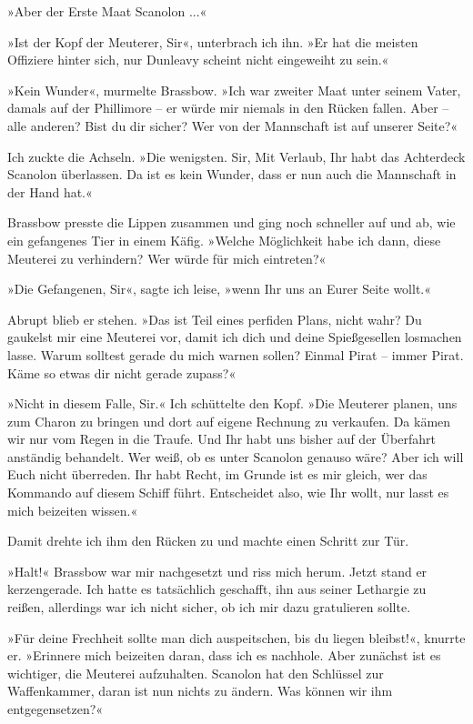 »Aber der Erste Maat Scanolon ...«

»Ist der Kopf der Meuterer, Sir«, unterbrach ich ihn. »Er hat die
meisten Offiziere hinter sich, nur Dunleavy scheint nicht
eingeweiht zu sein.«

»Kein Wunder«, murmelte Brassbow. »Ich war zweiter Maat unter
seinem Vater, damals auf der Phillimore – er würde mir niemals in
den Rücken fallen. Aber – alle anderen? Bist du dir sicher? Wer von
der Mannschaft ist auf unserer Seite?«

Ich zuckte die Achseln. »Die wenigsten. Sir, Mit Verlaub, Ihr habt
das Achterdeck Scanolon überlassen. Da ist es kein Wunder, dass er
nun auch die Mannschaft in der Hand hat.«

Brassbow presste die Lippen zusammen und ging noch schneller auf
und ab, wie ein gefangenes Tier in einem Käfig. »Welche Möglichkeit
habe ich dann, diese Meuterei zu verhindern? Wer würde für mich
eintreten?«

»Die Gefangenen, Sir«, sagte ich leise, »wenn Ihr uns an Eurer
Seite wollt.«

Abrupt blieb er stehen. »Das ist Teil eines perfiden Plans, nicht
wahr? Du gaukelst mir eine Meuterei vor, damit ich dich und deine
Spießgesellen losmachen lasse. Warum solltest gerade du mich warnen
sollen? Einmal Pirat – immer Pirat. Käme so etwas dir nicht gerade
zupass?«

»Nicht in diesem Falle, Sir.« Ich schüttelte den Kopf. »Die
Meuterer planen, uns zum Charon zu bringen und dort auf eigene
Rechnung zu verkaufen. Da kämen wir nur vom Regen in die Traufe.
Und Ihr habt uns bisher auf der Überfahrt anständig behandelt. Wer
weiß, ob es unter Scanolon genauso wäre? Aber ich will Euch nicht
überreden. Ihr habt Recht, im Grunde ist es mir gleich, wer das
Kommando auf diesem Schiff führt. Entscheidet also, wie Ihr wollt,
nur lasst es mich beizeiten wissen.«

Damit drehte ich ihm den Rücken zu und machte einen Schritt zur
Tür.

\bigpar

»Halt!« Brassbow war mir nachgesetzt und riss mich herum. Jetzt
stand er kerzengerade. Ich hatte es tatsächlich geschafft, ihn aus
seiner Lethargie zu reißen, allerdings war ich nicht sicher, ob ich
mir dazu gratulieren sollte.

»Für deine Frechheit sollte man dich auspeitschen, bis du liegen
bleibst!«, knurrte er. »Erinnere mich beizeiten daran, dass ich es
nachhole. Aber zunächst ist es wichtiger, die Meuterei aufzuhalten.
Scanolon hat den Schlüssel zur Waffenkammer, daran ist nun nichts
zu ändern. Was können wir ihm entgegensetzen?«

